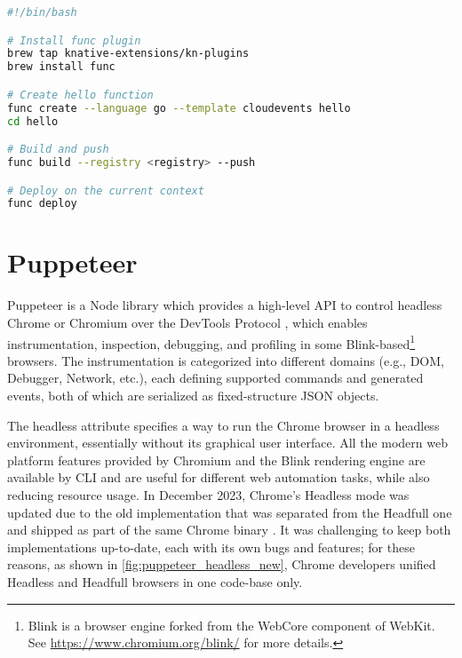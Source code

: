 \documentclass[../thesis.tex]{subfiles}
\begin{document}
\begin{lstlisting}[language=bash, captionpos=b, caption={[How to install and use func plugin]An example of how to install the \texttt{func} plugin and use it to create, build, push and deploy a simple function.}, label={code:knative_function}]
#!/bin/bash

# Install func plugin
brew tap knative-extensions/kn-plugins
brew install func

# Create hello function
func create --language go --template cloudevents hello
cd hello

# Build and push
func build --registry <registry> --push

# Deploy on the current context
func deploy
\end{lstlisting}

\section{Puppeteer}\label{sec:puppeteer}
Puppeteer is a Node library which provides a high-level \acrshort{API} to control headless Chrome or Chromium over the DevTools Protocol \cite{site:puppeteer, site:puppeteer_overview}, which enables instrumentation, inspection, debugging, and profiling in some Blink-based\footnote{Blink is a browser engine forked from the WebCore component of WebKit. See \href{https://www.chromium.org/blink/}{https://www.chromium.org/blink/} for more details.} browsers. The instrumentation is categorized into different domains (e.g., \acrshort{DOM}, Debugger, Network, etc.), each defining supported commands and generated events, both of which are serialized as fixed-structure \acrshort{JSON} objects.

The headless attribute specifies a way to run the Chrome browser in a headless environment, essentially without its graphical user interface. All the modern web platform features provided by Chromium and the Blink rendering engine are available by \acrshort{CLI} and are useful for different web automation tasks, while also reducing resource usage. In December 2023, Chrome's Headless mode was updated due to the old implementation that was separated from the Headfull one and shipped as part of the same Chrome binary \cite{site:puppeteer_headless_new}. It was challenging to keep both implementations up-to-date, each with its own bugs and features; for these reasons, as shown in \autoref{fig:puppeteer_headless_new}, Chrome developers unified Headless and Headfull browsers in one code-base only.
\end{document}
